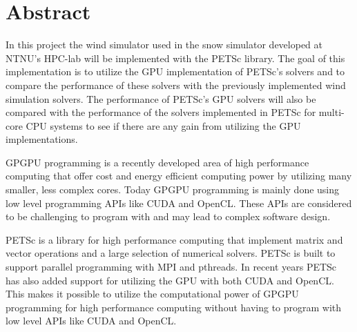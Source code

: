 \section*{Abstract}

In this project the wind simulator used in the snow simulator developed at
NTNU's HPC-lab will be implemented with the PETSc library. The goal of this
implementation is to utilize the GPU implementation of PETSc's solvers and to
compare the performance of these solvers with the previously implemented wind
simulation solvers. The performance of PETSc's GPU solvers will also be compared
with the performance of the solvers implemented in PETSc for multi-core CPU
systems to see if there are any gain from utilizing the GPU implementations.

GPGPU programming is a recently developed area of high performance computing that
offer cost and energy efficient computing power by utilizing many smaller, less
complex cores. Today GPGPU programming is mainly done using low level programming
APIs like CUDA and OpenCL. These APIs are considered to be challenging to
program with and may lead to complex software design.

PETSc is a library for high performance computing that implement matrix and vector
operations and a large selection of numerical solvers. PETSc is built to support
parallel programming with MPI and pthreads. In recent years PETSc has also added
support for utilizing the GPU with both CUDA and OpenCL. This makes it possible
to utilize the computational power of GPGPU programming for high performance
computing without having to program with low level APIs like CUDA and OpenCL.
